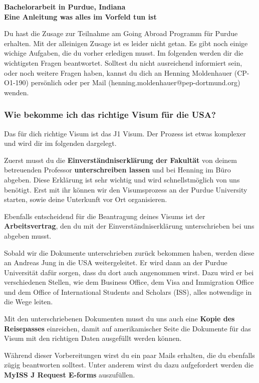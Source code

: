 \documentclass[
  paper=a4,
  fontsize=12pt,
  DIV=16,
  headheight=52pt,
  footheight=45pt,
  headinclude,
  parskip=full,
]{scrartcl}
\date{10. October 2017}
\begin{document}
\textbf{\Huge\sffamily Bachelorarbeit in Purdue, Indiana}\\[0.5\baselineskip]
\textbf{\Large\sffamily Eine Anleitung was alles im Vorfeld tun ist}

Du hast die Zusage zur Teilnahme am Going Abroad Programm für Purdue erhalten.
Mit der alleinigen Zusage ist es leider nicht getan.
Es gibt noch einige wichige Aufgaben, die du vorher erledigen musst.
Im folgenden werden dir die wichtigsten Fragen beantwortet.
Solltest du nicht ausreichend informiert sein, oder noch weitere Fragen haben,
kannst du dich an Henning Moldenhauer (CP-O1-190) persönlich oder per Mail
(henning.moldenhauer@pep-dortmund.org) wenden.

\subsubsection*{Wie bekomme ich das richtige Visum für die USA?}
Das für dich richtige Visum ist das J1 Visum.
Der Prozess ist etwas komplexer und wird dir im folgenden dargelegt.

Zuerst musst du die \textbf{Einverständniserklärung der Fakultät} von deinem
betreuenden Professor \textbf{unterschreiben lassen} und bei Henning im Büro
abgeben.
Diese Erklärung ist sehr wichtig und wird schnellstmöglich von uns benötigt.
Erst mit ihr können wir den Visumsprozess an der Purdue University starten, sowie
deine Unterkunft vor Ort organisieren.

Ebenfalls entscheidend für die Beantragung deines Visums ist der
\textbf{Arbeitsvertrag}, den du mit der Einverständniserklärung unterschrieben
bei uns abgeben musst.

Sobald wir die Dokumente unterschrieben zurück bekommen haben, werden diese an
Andreas Jung in die USA weitergeleitet.
Er wird dann an der Purdue Universität dafür sorgen, dass du dort auch angenommen
wirst. Dazu wird er bei verschiedenen Stellen, wie dem Business Office,
dem Visa and Immigration Office und dem Office of International Students and
Scholars (ISS), alles notwendige in die Wege leiten.

Mit den unterschriebenen Dokumenten musst du uns auch eine
\textbf{Kopie des Reisepasses} einreichen, damit auf amerikamischer Seite die
Dokumente für das Visum mit den richtigen Daten ausgefüllt werden können.

Während dieser Vorbereitungen wirst du ein paar Mails erhalten, die du
ebenfalls zügig beantworten solltest.
Unter anderem wirst du dazu aufgefordert werden die
\textbf{MyISS J Request E-forms} auszufüllen.
\end{document}

